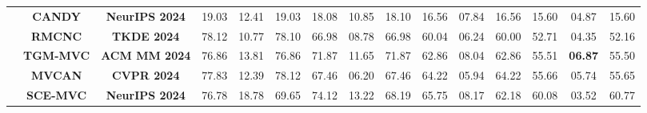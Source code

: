 \documentclass{article}
\theoremstyle{plain}
\theoremstyle{definition}
\theoremstyle{remark}
\begin{document}
\begin{table}[]
{\begin{tabular}{c|cc|ccc|ccc|ccc|ccc}
                            & \multicolumn{1}{c|}{\textbf{CANDY}}   & \textbf{NeurIPS 2024} & 19.03                                 & 12.41                                 & 19.03                                 & 18.08                                 & 10.85                                 & 18.10                                 & 16.56                                 & 07.84                                 & 16.56                                 & 15.60                                 & 04.87                                 & 15.60                                 \\
                            & \multicolumn{1}{c|}{\textbf{RMCNC}}   & \textbf{TKDE 2024}    & {\color[HTML]{3531FF} 78.12}          & 10.77                                 & 78.10                                 & 66.98                                 & 08.78                                 & 66.98                                 & 60.04                                 & 06.24                                 & 60.00                                 & 52.71                                 & 04.35                                 & 52.16                                 \\
                            & \multicolumn{1}{c|}{\textbf{TGM-MVC}} & \textbf{ACM MM 2024}  & 76.86                                 & 13.81                                 & 76.86                                 & 71.87                                 & 11.65                                 & {\color[HTML]{3531FF} 71.87}          & 62.86                                 & 08.04                                 & {\color[HTML]{3531FF} 62.86}          & 55.51                                 & {\color[HTML]{FF0000} \textbf{06.87}}           & 55.50                                 \\
                            & \multicolumn{1}{c|}{\textbf{MVCAN}}   & \textbf{CVPR 2024}    & 77.83                                 & 12.39                                 & {\color[HTML]{3531FF} 78.12}          & 67.46                                 & 06.20                                 & 67.46                                 & 64.22                                 & 05.94                                 & 64.22                                 & 55.66                                 & 05.74                                 & 55.65                                 \\
                            & \multicolumn{1}{c|}{\textbf{SCE-MVC}} & \textbf{NeurIPS 2024} & 76.78                                 & {\color[HTML]{3531FF} 18.78}          & 69.65                                 & {\color[HTML]{3531FF} 74.12}          & {\color[HTML]{3531FF} 13.22}          & 68.19                                 & {\color[HTML]{3531FF} 65.75}          & {\color[HTML]{3531FF} 08.17}          & 62.18                                 & {\color[HTML]{3531FF} 60.08}          & 03.52                                 & {\color[HTML]{3531FF} 60.77}          \\

\end{tabular}}
\end{table}
\end{document}
